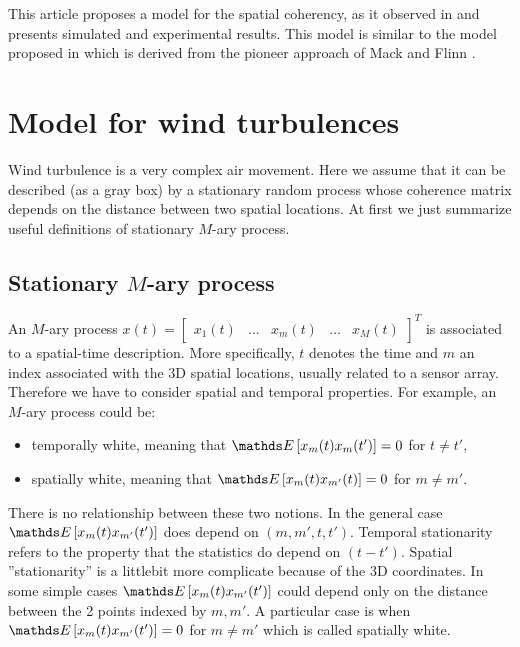 This article proposes a model for the spatial coherency, as it observed in \cite{alcoverro:2005} and presents simulated and experimental results. This model is similar to the model proposed in \cite{nouvellet_itwb:2013} which is derived from the pioneer approach of Mack and Flinn \cite{mack_flinn:1971}.

\section{Model for wind turbulences}
Wind turbulence is a very complex air movement. Here we assume that it can be described (as a gray box) by a stationary random  process whose coherence matrix depends on the distance between two spatial locations. At first we just summarize useful definitions of stationary $M$-ary process.

\subsection{Stationary $M$-ary process}
An $M$-ary process $x(t)=\begin{bmatrix}
x_{1}(t)&\ldots&x_{m}(t)&\ldots&x_{M}(t)
\end{bmatrix}^{T}$ is associated to a spatial-time description. More specifically, $t$ denotes the time and $m$ an index associated with the 3D spatial locations, usually related to a sensor array.  Therefore we have to consider spatial and temporal properties. For example, an $M$-ary process could be:
\begin{itemize}
 \item
temporally white, meaning that $\esp{x_m(t)x_m(t')}=0$ for $t\neq t'$,
\item
spatially white, meaning that $\esp{x_m(t)x_{m'}(t)}=0$ for $m\neq m'$.
\end{itemize} 
There is no relationship between these two notions. In the general case $\esp{x_m(t)x_{m'}(t')}$ does depend on $(m,m',t,t')$. Temporal stationarity refers to the property that the statistics do depend on $(t-t')$. Spatial ''stationarity'' is a littlebit more complicate because of the 3D coordinates. In some simple cases $\esp{x_m(t)x_{m'}(t')}$ could depend only on the distance between the 2 points indexed by $m,m'$. A particular case is when $\esp{x_m(t)x_{m'}(t')}=0$ for $m\neq m'$ which is called spatially white.

